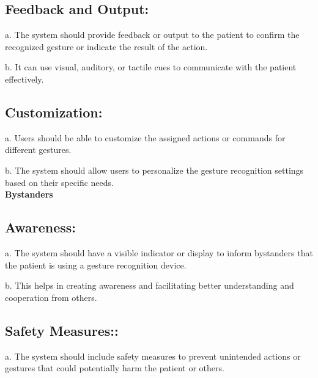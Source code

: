 \documentclass[a4paper,12pt,oneside]{report}
\begin{document}
\subsection{ Feedback and Output:}
 \par
a. The system should provide feedback or output to the patient to confirm the recognized gesture or indicate the result of the action.
    
    

 \par
b. It can use visual, auditory, or tactile cues to communicate with the patient effectively.
\\
\subsection{ Customization:}
 \par
   a. Users should be able to customize the assigned actions or commands for different gestures.
    

 \par
b. The system should allow users to personalize the gesture recognition settings based on their specific needs.
\\
\textbf{\large Bystanders}
\subsection{ Awareness:}
 \par

    a. The system should have a visible indicator or display to inform bystanders that the patient is using a gesture recognition device.


    
    

 \par
    b. This helps in creating awareness and facilitating better understanding and cooperation from others.
\\
  
   


    
   
   
    
\subsection{ Safety Measures::}
 \par
   a. The system should include safety measures to prevent unintended actions or gestures that could potentially harm the patient or others.
    
\end{document}

